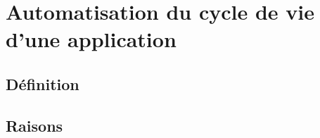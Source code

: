 \section[Automatisation]{Automatisation du cycle de vie d'une application}

\subsection{Définition}
\begin{frame}{\subsecname}
\end{frame}

\subsection{Raisons}
\begin{frame}{\subsecname}
\end{frame}

